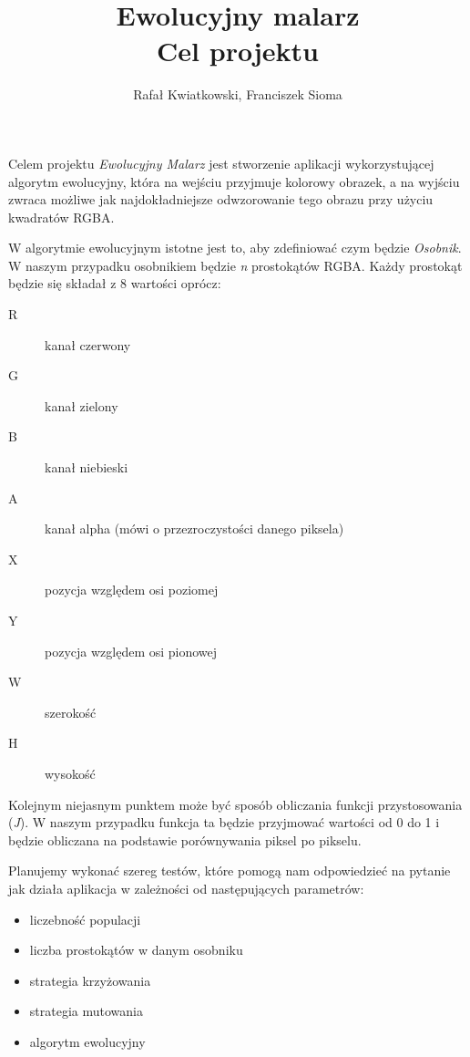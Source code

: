 \documentclass{article}
\title{Ewolucyjny malarz \\ \large Cel projektu}
\author{Rafał Kwiatkowski, Franciszek Sioma}
\begin{document}
\maketitle

Celem projektu {\it Ewolucyjny Malarz} jest stworzenie aplikacji wykorzystującej algorytm ewolucyjny, która na wejściu przyjmuje kolorowy obrazek, a na wyjściu zwraca możliwe jak najdokładniejsze odwzorowanie tego obrazu przy użyciu kwadratów RGBA. 

W algorytmie ewolucyjnym istotne jest to, aby zdefiniować czym będzie {\it Osobnik}. W naszym przypadku osobnikiem będzie {\it n} prostokątów RGBA. Każdy prostokąt będzie się składał z 8 wartości oprócz: 
\begin{description}
    \item[R] kanał czerwony
    \item[G] kanał zielony
    \item[B] kanał niebieski
    \item[A] kanał alpha (mówi o przezroczystości danego piksela)
    \item[X] pozycja względem osi poziomej
    \item[Y] pozycja względem osi pionowej
    \item[W] szerokość
    \item[H] wysokość       
\end{description}

Kolejnym niejasnym punktem może być sposób obliczania funkcji przystosowania ({\it J}). W naszym przypadku funkcja ta będzie przyjmować wartości od 0 do 1 i będzie obliczana na podstawie porównywania piksel po pikselu.

Planujemy wykonać szereg testów, które pomogą nam odpowiedzieć na pytanie jak działa aplikacja w zależności od następujących parametrów:
\begin{itemize}
    \item liczebność populacji
    \item liczba prostokątów w danym osobniku
    \item strategia krzyżowania
    \item strategia mutowania
    \item algorytm ewolucyjny
\end{itemize}
\end{document}
